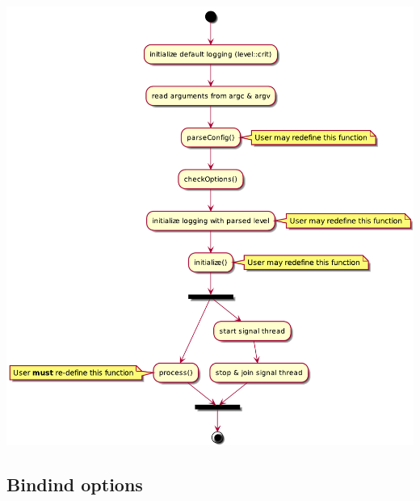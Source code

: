 \begin{DoxyImageNoCaption}
  \mbox{\includegraphics[width=\textwidth,height=\textheight/2,keepaspectratio=true]{Application}}
\end{DoxyImageNoCaption}
\hypertarget{classxtd_1_1Application_sec_binding_options}{}\subsection{Bindind options}\label{classxtd_1_1Application_sec_binding_options}

